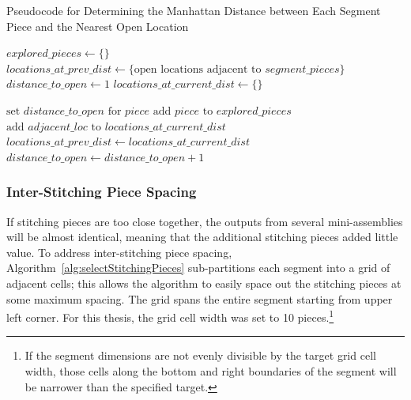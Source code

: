 \begin{algorithm}[t]
\caption{Pseudocode for Determining the Manhattan Distance between Each Segment Piece and the Nearest Open Location}\label{alg:findDistanceToOpen}
\begin{algorithmic}[1]
    \State $explored\_pieces \gets \{ \}$
    \State $locations\_at\_prev\_dist \gets \{ \text{open locations adjacent to } segment\_pieces \}$
    \State $distance\_to\_open \gets 1$
     \label{op:distanceRoundWhileLoop}
        \State $locations\_at\_current\_dist \gets \{ \}$
        		
        			\State $\text{set } distance\_to\_open \text{ for } piece$
        			\State $\text{add } piece \text{ to } explored\_pieces$
        			\State $\text{add } adjacent\_loc \text{ to } locations\_at\_current\_dist$
        		\EndIf
        	\EndFor
        \EndFor
    \State $locations\_at\_prev\_dist \gets locations\_at\_current\_dist$
    \State $distance\_to\_open \gets distance\_to\_open + 1$
    \EndWhile
\EndProcedure
\end{algorithmic}
\end{algorithm}


\subsubsection{Inter-Stitching Piece Spacing}\label{sec:spacingBetweenStitchingPieces}

If stitching pieces are too close together, the outputs from several mini-assemblies will be almost identical, meaning that the additional stitching pieces added little value.  To address inter-stitching piece spacing, Algorithm~\ref{alg:selectStitchingPieces} sub-partitions each segment into a grid of adjacent cells; this allows the algorithm to easily space out the stitching pieces at some maximum spacing.  The grid spans the entire segment starting from upper left corner.  For this thesis, the grid cell width was set to 10 pieces.\footnote{If the segment dimensions are not evenly divisible by the target grid cell width, those cells along the bottom and right boundaries of the segment will be narrower than the specified target.} 

